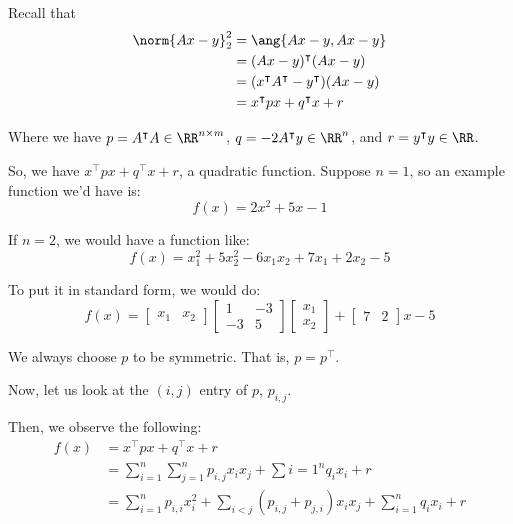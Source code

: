 \documentclass[openany]{book}
\begin{document}
Recall that
\begin{align*}
	\norm{Ax-y}_2^{2} &= \ang{Ax-y, Ax-y} \\
	&= (Ax-y)^{\intercal}(Ax-y) \\
	&= (x^{\intercal}A^{\intercal} - y^{\intercal})(Ax - y) \\
	&= x^{\intercal}px + q^{\intercal}x + r
\end{align*}

	Where we have $p = A^{\intercal}A \in \RR^{n \times m}$, $q = -2A^{\intercal}y \in \RR^{n}$, and $r = y^{\intercal}y \in \RR$.
	
	So, we have $x^{\intercal}px + q^{\intercal}x + r$, a quadratic function. Suppose $n = 1$, so an example function we'd have is:
	\begin{equation*}
		f(x) = 2x^{2} + 5x - 1
	\end{equation*}

	If $n=2$, we would have a function like:
	\begin{equation*}
		f(x) = x_1^{2} + 5x_2^{2} - 6x_1x_2 + 7x_1 + 2x_2 - 5
	\end{equation*}

	To put it in standard form, we would do:
	\begin{equation*}
		f(x) = \begin{bmatrix}
			x_1 & x_2
		\end{bmatrix}\begin{bmatrix}
		1 & -3 \\ -3 & 5
	\end{bmatrix}\begin{bmatrix}
	x_1 \\ x_2
\end{bmatrix} + \begin{bmatrix}
7 & 2
\end{bmatrix}x - 5
	\end{equation*}

	We always choose $p$ to be symmetric. That is, $p = p^{\intercal}$.
	
	Now, let us look at the $(i, j)$ entry of $p$, $p_{i, j}$.
	
	Then, we observe the following:
	\begin{align*}
		f(x) &= x^{\intercal}px + q^{\intercal}x + r \\
		&= \sum_{i=1}^{n} \sum_{j=1}^{n} p_{i,j}x_ix_j + \sum{i=1}^{n}q_ix_i + r \\
		&= \sum_{i=1}^{n}p_{i, i}x_i^{2} + \sum_{i < j} (p_{i,j} + p_{j,i})x_ix_j + \sum_{i = 1}^{n}q_ix_i + r
	\end{align*}
\end{document}
